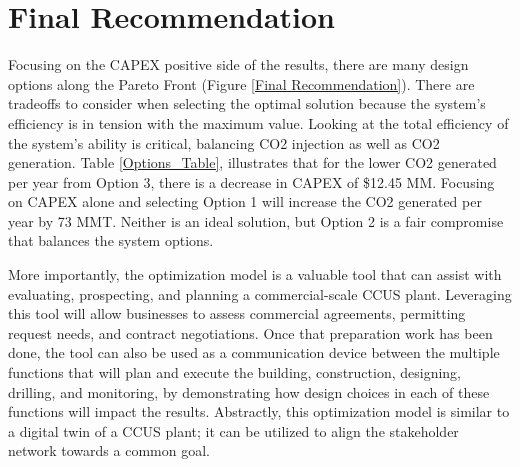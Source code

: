 \documentclass[balance,upint,subscriptcorrection,varvw,mathalfa=cal=boondoxo,spanish,french,vietnamese,russian,greek,pdf-a,colorlinks]{asmeconf}
\begin{document}
\begin{table}[btp]
\caption[Table]{SMS EMOA vs. NSGA-2}\label{EMOA:1}
\end{table}

\section{Final Recommendation}
Focusing on the CAPEX positive side of the results, there are many design options along the Pareto Front (Figure \ref{Final Recommendation}). There are tradeoffs to consider when selecting the optimal solution because the system's efficiency is in tension with the maximum value. Looking at the total efficiency of the system's ability is critical, balancing CO2 injection as well as CO2 generation. Table \ref{Options_Table}, illustrates that for the lower CO2 generated per year from Option 3, there is a decrease in CAPEX of \$12.45 MM. Focusing on CAPEX alone and selecting Option 1 will increase the CO2 generated per year by 73 MMT. Neither is an ideal solution, but Option 2 is a fair compromise that balances the system options. 

More importantly, the optimization model is a valuable tool that can assist with evaluating, prospecting, and planning a commercial-scale CCUS plant. Leveraging this tool will allow businesses to assess commercial agreements, permitting request needs, and contract negotiations. Once that preparation work has been done, the tool can also be used as a communication device between the multiple functions that will plan and execute the building, construction, designing, drilling, and monitoring, by demonstrating how design choices in each of these functions will impact the results. Abstractly, this optimization model is similar to a digital twin of a CCUS plant; it can be utilized to align the stakeholder network towards a common goal. 
\end{document}
